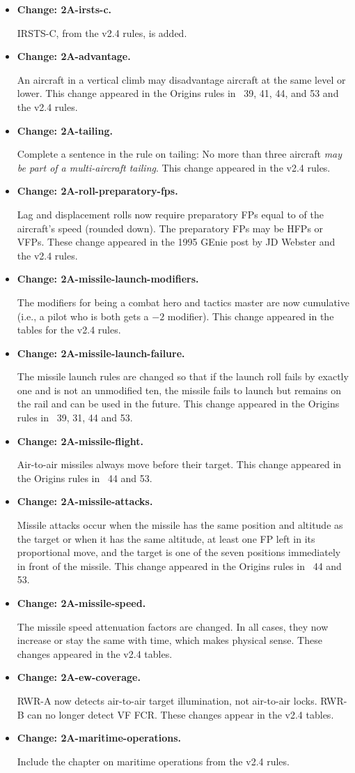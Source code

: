 \documentclass[10pt]{report}
\newcommand{\itemtag}[1]{\item \textbf{Change: #1.}\par}
\begin{document}
\begin{itemize}
    \itemtag{2A-irsts-c} IRSTS-C, from the v2.4 rules, is added.

    \itemtag{2A-advantage} An aircraft in a vertical climb may disadvantage aircraft at the same level or lower. This change appeared in the Origins rules in {\APJ}~39, 41, 44, and 53 and the v2.4 rules.
    
    \itemtag{2A-tailing} Complete a sentence in the rule on tailing: No more than three aircraft \emph{may be part of a multi-aircraft tailing}. This change appeared in the v2.4 rules.

    \itemtag{2A-roll-preparatory-fps} Lag and displacement rolls now require preparatory FPs equal to {\onethird} of the aircraft's speed (rounded down). The preparatory FPs may be HFPs or VFPs. These change appeared in the 1995 GEnie post by JD Webster and the v2.4 rules.
    
    \itemtag{2A-missile-launch-modifiers} The modifiers for being a combat hero and tactics master are now cumulative (i.e., a pilot who is both gets a $-2$ modifier). This change appeared in the tables for the v2.4 rules.
    
    \itemtag{2A-missile-launch-failure} The missile launch rules are changed so that if the launch roll fails by exactly one and is not an unmodified ten, the missile fails to launch but remains on the rail and can be used in the future. This change appeared in the Origins rules in \APJ~39, 31, 44 and 53.

    \itemtag{2A-missile-flight} Air-to-air missiles always move before their target. This change appeared in the Origins rules in \APJ~44 and 53.

    \itemtag{2A-missile-attacks} Missile attacks occur when the missile has the same position and altitude as the target or when it has the same altitude, at least one FP left in its proportional move, and the target is one of the seven positions immediately in front of the missile. This change appeared in the Origins rules in \APJ~44 and 53.

    \itemtag{2A-missile-speed} The missile speed attenuation factors are changed. In all cases, they now increase or stay the same with time, which makes physical sense. These changes appeared in the v2.4 tables.

    \itemtag{2A-ew-coverage} RWR-A now detects air-to-air target illumination, not air-to-air locks. RWR-B can no longer detect VF FCR. These changes appear in the v2.4 tables.

    \itemtag{2A-maritime-operations} Include the chapter on maritime operations from the v2.4 rules.
    
\end{itemize}
\end{document}
